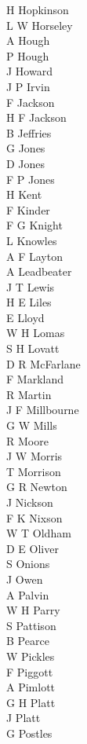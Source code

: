 \begin{multicols}{3}
  H Hopkinson \\
  L W Horseley \\
  A Hough \\
  P Hough \\
  J Howard \\
  J P Irvin \\
  F Jackson \\
  H F Jackson \\
  B Jeffries \\
  G Jones \\
  D Jones \\
  F P Jones \\
  H Kent \\
  F Kinder \\
  F G Knight \\
  L Knowles \\
  A F Layton \\
  A Leadbeater \\
  J T Lewis \\
  H E Liles \\
  E Lloyd \\
  W H Lomas \\
  S H Lovatt \\
  D R McFarlane \\
  F Markland \\
  R Martin \\
  J F Millbourne \\
  G W Mills \\
  R Moore \\
  J W Morris \\
  T Morrison \\
  G R Newton \\
  J Nickson \\
  F K Nixson \\
  W T Oldham \\
  D E Oliver \\
  S Onions \\
  J Owen \\
  A Palvin \\
  W H Parry \\
  S Pattison \\
  B Pearce \\
  W Pickles \\
  F Piggott \\
  A Pimlott \\
  G H Platt \\
  J Platt \\
  G Postles \\

\end{multicols}
